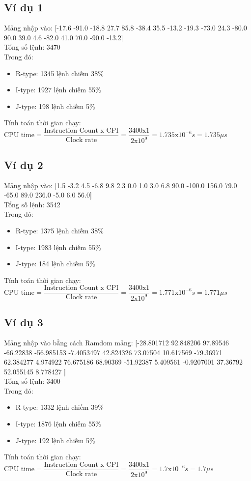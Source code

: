\documentclass[a4paper]{article}
\begin{document}
\subsection{Ví dụ 1}
Mảng nhập vào: [-17.6 -91.0 -18.8 27.7 85.8 -38.4 35.5 -13.2 -19.3 -73.0 24.3 -80.0 90.0 39.0 4.6 -82.0 41.0 70.0 -90.0 -13.2]\\
Tổng số lệnh: 3470\\
Trong đó:
\begin{itemize}
	\item R-type: 1345 lệnh chiếm 38\%
	\item I-type: 1927 lệnh chiếm 55\%
	\item J-type: 198 lệnh chiếm 5\%
\end{itemize}
Tính toán thời gian chạy:\\
$\text{CPU time} = \dfrac{\text{Instruction Count x CPI}}{\text{Clock rate}} = \dfrac{3400\text{x}1}{2\text{x}10^9} = 1.735 \text{x}10^{-6} s = 1.735 \mu s$
\subsection{Ví dụ 2}
Mảng nhập vào: [1.5 -3.2 4.5 -6.8 9.8 2.3 0.0 1.0 3.0 6.8 90.0 -100.0 156.0 79.0 -65.0 89.0 236.0 -5.0 6.0 56.0]\\
Tổng số lệnh: 3542\\
Trong đó:
\begin{itemize}
	\item R-type: 1375 lệnh chiếm 38\%
	\item I-type: 1983 lệnh chiếm 55\%
	\item J-type: 184 lệnh chiếm 5\%
\end{itemize}
Tính toán thời gian chạy:\\
$\text{CPU time} = \dfrac{\text{Instruction Count x CPI}}{\text{Clock rate}} = \dfrac{3400\text{x}1}{2\text{x}10^9} = 1.771 \text{x}10^{-6} s = 1.771 \mu s$
\subsection{Ví dụ 3}
Mảng nhập vào bằng cách Ramdom mảng: [-28.801712 92.848206 97.89546 -66.22838 -56.985153 -7.4053497 42.824326 73.07504 10.617569 -79.36971 62.384277 4.974922 76.675186 68.90369 -51.92387 5.409561 -0.9207001 37.36792 52.055145 8.778427 ]\\
Tổng số lệnh: 3400\\
Trong đó:
\begin{itemize}
	\item R-type: 1332 lệnh chiếm 39\%
	\item I-type: 1876 lệnh chiếm 55\%
	\item J-type: 192 lệnh chiếm 5\%
\end{itemize}
Tính toán thời gian chạy:\\
$\text{CPU time} = \dfrac{\text{Instruction Count x CPI}}{\text{Clock rate}} = \dfrac{3400\text{x}1}{2\text{x}10^9} = 1.7 \text{x}10^{-6} s = 1.7 \mu s$
\end{document}
